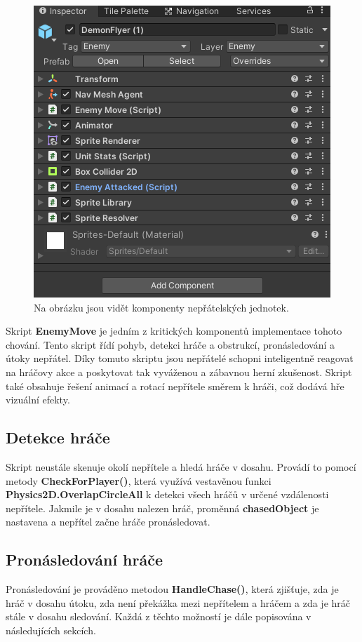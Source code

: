 \begin{figure}[H]
	\centering
	\includegraphics[scale=1]{obrazky-figures/EnemyComponents.png}
	\caption{Na obrázku jsou vidět komponenty nepřátelských jednotek.}
	\label{EnemyScripts}
\end{figure}

Skript \textbf{EnemyMove} je jedním z kritických komponentů implementace tohoto chování. Tento skript řídí pohyb, detekci hráče a obstrukcí, pronásledování a útoky nepřátel. Díky tomuto skriptu jsou nepřátelé schopni inteligentně reagovat na hráčovy akce a poskytovat tak vyváženou a zábavnou herní zkušenost. Skript také obsahuje řešení animací a rotací nepřítele směrem k hráči, což dodává hře vizuální efekty.

\subsection{Detekce hráče}
Skript neustále skenuje okolí nepřítele a hledá hráče v dosahu. Provádí to pomocí metody \textbf{CheckForPlayer()}, která využívá vestavěnou funkci \textbf{Physics2D.OverlapCircleAll} k detekci všech hráčů v určené vzdálenosti nepřítele. Jakmile je v dosahu nalezen hráč, proměnná \textbf{chasedObject} je nastavena a nepřítel začne hráče pronásledovat.

\subsection{Pronásledování hráče}
Pronásledování je prováděno metodou \textbf{HandleChase()}, která zjišťuje, zda je hráč v dosahu útoku, zda není překážka mezi nepřítelem a hráčem a zda je hráč stále v dosahu sledování. Každá z těchto možností je dále popisována v následujících sekcích.

